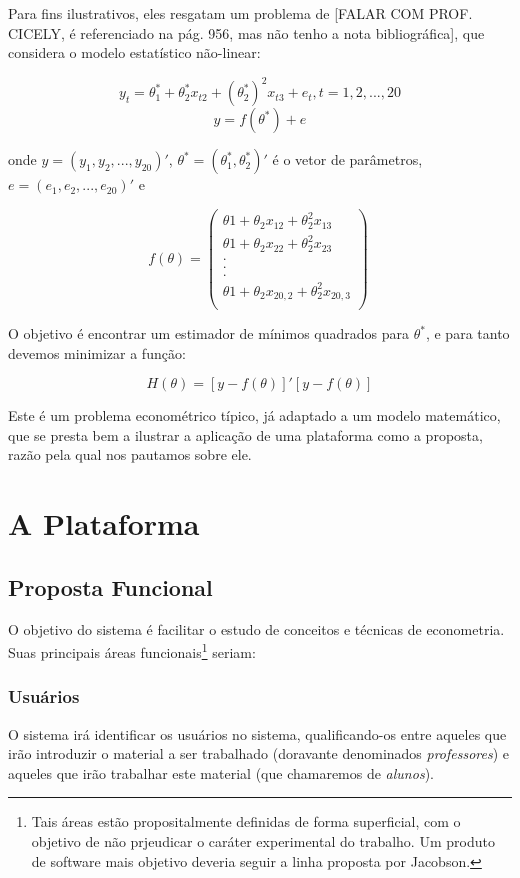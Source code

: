 \documentclass{abnt}
\begin{document}
Para fins ilustrativos, eles resgatam um problema de [FALAR COM PROF. CICELY, é referenciado na pág. 956, mas não tenho a nota bibliográfica], que considera o modelo estatístico não-linear:

\[ y_t = \theta_1^* + \theta_2^* x_{t2} + (\theta_2^*)^2 x_{t3} +e_t , t = 1,2,...,20 \]
\[ y = f(\theta^*)+e\]

onde $y = (y_1, y_2, ..., y_{20})'$, $\theta^* = (\theta_1^*, \theta_2^*)'$ é o vetor de parâmetros, $e = (e_1, e_2, ..., e_{20})'$ e

\[ f(\theta)=
	\left( \begin{array}{ccc}
\theta1 + \theta_2 x_{12} + \theta_2^2 x_{13} \\
\theta1 + \theta_2 x_{22} + \theta_2^2 x_{23} \\
.\\
.\\
.\\
\theta1 + \theta_2 x_{20,2} + \theta_2^2 x_{20,3} \\


\end{array} \right)\
 \]
 
 O objetivo é encontrar um estimador de mínimos quadrados para $\theta^*$, e para tanto devemos minimizar a função:
 
 \[ H(\theta) = [y - f(\theta)]'[y - f(\theta)] \]

Este é um problema econométrico típico, já adaptado a um modelo matemático, que se presta bem a ilustrar a aplicação de uma plataforma como a proposta, razão pela qual nos pautamos sobre ele.




\chapter {A Plataforma}

\section{Proposta Funcional}

O objetivo do sistema é facilitar o estudo de conceitos e técnicas de econometria. Suas principais áreas funcionais\footnote{Tais áreas estão propositalmente definidas de forma superficial, com o objetivo de não prjeudicar o caráter experimental do trabalho. Um produto de software mais objetivo deveria seguir a linha proposta por Jacobson\cite{Jacobson}.} seriam:

\subsection{Usuários}
O sistema irá identificar os usuários no sistema, qualificando-os entre aqueles que irão introduzir o material a ser trabalhado (doravante denominados \textit{professores}) e aqueles que irão trabalhar este material (que chamaremos de \textit{alunos}).
\end{document}
